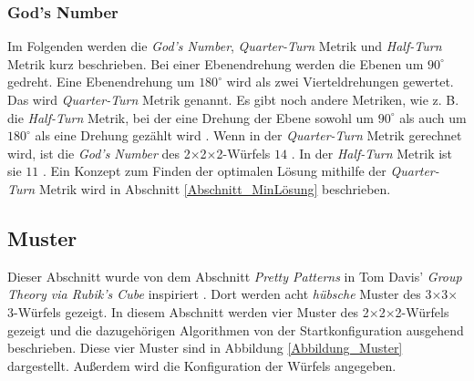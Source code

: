 \documentclass[12pt,a4paper, usenames, dvipsnames]{article}
\theoremstyle{mystyle}
\theoremstyle{definition}
\newcommand{\Ttwo}{2$\times$2$\times$2-}
\newcommand{\Tthree}{3$\times$3$\times$3-}
\begin{document}
\subsubsection*{God's Number}
Im Folgenden werden die \textit{God's Number}, \textit{Quarter-Turn} Metrik und \textit{Half-Turn} Metrik kurz beschrieben.
Bei einer Ebenendrehung werden die Ebenen um $90^\circ$ gedreht. Eine Ebenendrehung um $180^\circ$ wird als zwei Vierteldrehungen gewertet. Das wird \textit{Quarter-Turn} Metrik genannt. Es gibt noch andere Metriken, wie z. B. die \textit{Half-Turn} Metrik, bei der eine Drehung der Ebene sowohl um $90^\circ$ als auch um $180^\circ$ als eine Drehung gezählt wird \cite{TR}.
Wenn in der \textit{Quarter-Turn} Metrik gerechnet wird, ist die \textit{God's Number} des \Ttwo Würfels $14$ \cite{DJ}. In der \textit{Half-Turn} Metrik ist sie $11$ \cite{RMG}.
Ein Konzept zum Finden der optimalen Lösung mithilfe der \textit{Quarter-Turn} Metrik wird in Abschnitt \ref{Abschnitt_MinLösung} beschrieben.


%
%
%
%
%
%
%
%
%
%
%
%
%
%
%
%
%
%
%
\subsection{Muster}

Dieser Abschnitt wurde von dem Abschnitt \textit{Pretty Patterns} in Tom Davis' \textit{Group Theory via Rubik's Cube} inspiriert \cite{TD}.
Dort werden acht \textit{hübsche} Muster des \Tthree Würfels gezeigt. In diesem Abschnitt werden vier Muster des \Ttwo Würfels gezeigt und die dazugehörigen Algorithmen von der Startkonfiguration ausgehend beschrieben. Diese vier Muster sind in Abbildung \ref{Abbildung_Muster} dargestellt.
Außerdem wird die Konfiguration der Würfels angegeben.
\end{document}
